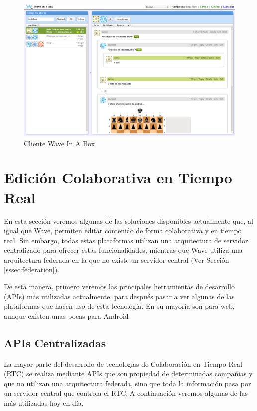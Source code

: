 	\begin{figure}[H]
      \centering
		\includegraphics[keepaspectratio, scale=0.3]{Media/Captures/WIAB_Server.png}
      \caption{Cliente Wave In A Box}
      \label{fig:wiab_client}
    \end{figure} 

\section{Edición Colaborativa en Tiempo Real}

En esta sección veremos algunas de las soluciones disponibles actualmente que, al igual que Wave, permiten editar contenido de forma colaborativa y en tiempo real. Sin embargo, todas estas plataformas utilizan una arquitectura de servidor centralizado para ofrecer estas funcionalidades, mientras que Wave utiliza una arquitectura federada en la que no existe un servidor central (Ver Sección \ref{sssec:federation}).

De esta manera, primero veremos las principales herramientas de desarrollo (APIs) más utilizadas actualmente, para después pasar a ver algunas de las plataformas que hacen uso de esta tecnología. En su mayoría son para web, aunque existen unas pocas para Android. 
	
	\subsection{APIs Centralizadas}
	
	La mayor parte del desarrollo de tecnologías de Colaboración en Tiempo Real (RTC) se realiza mediante APIs que son propiedad de determinadas compañias y que no utilizan una arquitectura federada, sino que toda la información pasa por un servidor central que controla el RTC. A continuación veremos algunas de las más utilizadas hoy en día.
	
